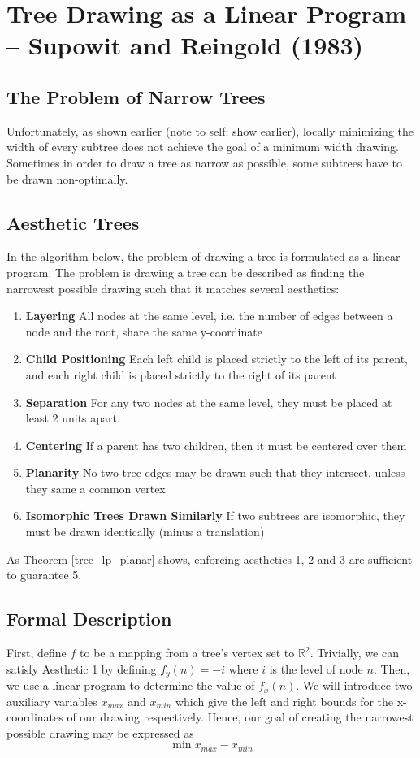 \documentclass[11pt]{report}
\begin{document}
\section{Tree Drawing as a Linear Program -- Supowit and Reingold (1983)}
\subsection{The Problem of Narrow Trees}
Unfortunately, as shown earlier (note to self: show earlier), locally minimizing the width of every subtree does not achieve the goal of a minimum width drawing. Sometimes in order to draw a tree as narrow as possible, some subtrees have to be drawn non-optimally.

\subsection{Aesthetic Trees}

In the algorithm below, the problem of drawing a tree is formulated as a linear program. The problem is drawing a tree can be described as finding the narrowest possible drawing such that it matches several aesthetics:
\begin{enumerate}
    \item \textbf{Layering} All nodes at the same level, i.e. the number of edges between a node and the root, share the same y-coordinate
    \item \textbf{Child Positioning} Each left child is placed strictly to the left of its parent, and each right child is placed strictly to the right of its parent
    \item \textbf{Separation} For any two nodes at the same level, they must be placed at least 2 units apart.
    \item \textbf{Centering} If a parent has two children, then it must be centered over them
    \item \textbf{Planarity} No two tree edges may be drawn such that they intersect, unless they same a common vertex
    \item \textbf{Isomorphic Trees Drawn Similarly} If two subtrees are isomorphic, they must be drawn identically (minus a translation)
\end{enumerate}

As Theorem \ref{tree_lp_planar} shows, enforcing aesthetics 1, 2 and 3 are sufficient to guarantee 5.

\subsection{Formal Description}
First, define $f$ to be a mapping from a tree's vertex set to $\mathbb{R}^2$. Trivially, we can satisfy Aesthetic 1 by defining $f_y(n) = -i$ where $i$ is the level of node $n$. Then, we use a linear program to determine the value of $f_x(n)$. We will introduce two auxiliary variables $x_{max}$ and $x_{min}$ which give the left and right bounds for the x-coordinates of our drawing respectively. Hence, our goal of creating the narrowest possible drawing may be expressed as 
\[
\min{x_{max} - x_{min}}
\]
\end{document}
